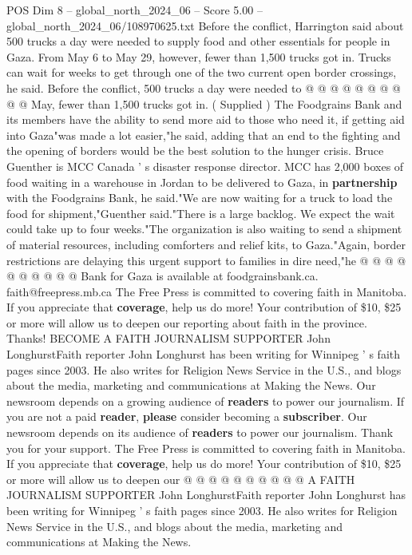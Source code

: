 \begin{textsample}{POS Dim 8 – global\_north\_2024\_06 – Score 5.00 – global\_north\_2024\_06/108970625.txt}
Before the conflict, Harrington said about 500 trucks a day were needed to supply food and other essentials for people in Gaza.
From May 6 to May 29, however, fewer than 1,500 trucks got in.
Trucks can wait for weeks to get through one of the two current open border crossings, he said.
Before the conflict, 500 trucks a day were needed to @ @ @ @ @ @ @ @ @ @ May, fewer than 1,500 trucks got in. ( Supplied ) The Foodgrains Bank and its members have the ability to send more aid to those who need it, if getting aid into Gaza"was made a lot easier,"he said, adding that an end to the fighting and the opening of borders would be the best solution to the hunger crisis.
Bruce Guenther is MCC Canada ' s disaster response director.
MCC has 2,000 boxes of food waiting in a warehouse in Jordan to be delivered to Gaza, in \textbf{partnership} with the Foodgrains Bank, he said."We are now waiting for a truck to load the food for shipment,"Guenther said."There is a large backlog.
We expect the wait could take up to four weeks."The organization is also waiting to send a shipment of material resources, including comforters and relief kits, to Gaza."Again, border restrictions are delaying this urgent support to families in dire need,"he @ @ @ @ @ @ @ @ @ @ Bank for Gaza is available at foodgrainsbank.ca. faith@freepress.mb.ca The Free Press is committed to covering faith in Manitoba.
If you appreciate that \textbf{coverage}, help us do more!
Your contribution of \$10, \$25 or more will allow us to deepen our reporting about faith in the province.
Thanks!
BECOME A FAITH JOURNALISM SUPPORTER John LonghurstFaith reporter John Longhurst has been writing for Winnipeg ' s faith pages since 2003.
He also writes for Religion News Service in the U.S., and blogs about the media, marketing and communications at Making the News.
Our newsroom depends on a growing audience of \textbf{readers} to power our journalism.
If you are not a paid \textbf{reader}, \textbf{please} consider becoming a \textbf{subscriber}.
Our newsroom depends on its audience of \textbf{readers} to power our journalism.
Thank you for your support.
The Free Press is committed to covering faith in Manitoba.
If you appreciate that \textbf{coverage}, help us do more!
Your contribution of \$10, \$25 or more will allow us to deepen our @ @ @ @ @ @ @ @ @ @ A FAITH JOURNALISM SUPPORTER John LonghurstFaith reporter John Longhurst has been writing for Winnipeg ' s faith pages since 2003.
He also writes for Religion News Service in the U.S., and blogs about the media, marketing and communications at Making the News.

\end{textsample}
